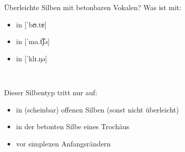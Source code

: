 

\begin{frame}
  {Überleichte Silben mit betonbaren Vokalen?}
  \pause
  Was ist mit:
  \begin{itemize}[<+->]
    \item \rot{[bʊ]} in [ˈbʊ.tɐ]
    \item \rot{[ma]} in [ˈma.t͡ʃə]
    \item \rot{[klɪ]} in [ˈklɪ.ŋə]
  \end{itemize}
  \Zeile
  \centering
  \pause
  \\
  \Zeile
  \pause
  \raggedright
  Dieser Silbentyp tritt nur auf:\\
  \begin{itemize}[<+->]
    \item \alert{in (scheinbar) offenen Silben} (sonst nicht überleicht)
    \item \alert{in der betonten Silbe eines Trochäus}
    \item \alert{vor simplexen Anfangsrändern}
  \end{itemize}
\end{frame}

